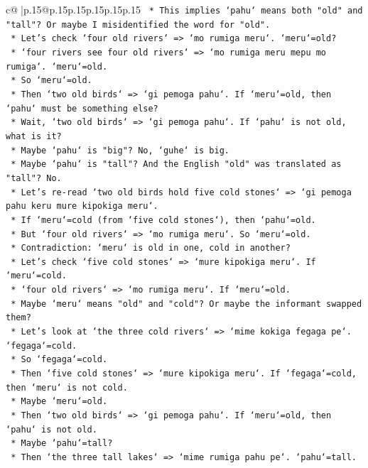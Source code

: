\documentclass{article}
\begin{document}
{\begin{supertabular}{c@{$\;$}|p{.15\linewidth}@{}p{.15\linewidth}p{.15\linewidth}p{.15\linewidth}p{.15\linewidth}p{.15\linewidth}}
{{{\texttt{    *   This implies `pahu` means both "old" and "tall"? Or maybe I misidentified the word for "old".} \\
\texttt{    *   Let's check `four old rivers` => `mo rumiga meru`. `meru`=old?} \\
\texttt{    *   `four rivers see four old rivers` => `mo rumiga meru mepu mo rumiga`. `meru`=old.} \\
\texttt{    *   So `meru`=old.} \\
\texttt{    *   Then `two old birds` => `gi pemoga pahu`. If `meru`=old, then `pahu` must be something else?} \\
\texttt{    *   Wait, `two old birds` => `gi pemoga pahu`. If `pahu` is not old, what is it?} \\
\texttt{    *   Maybe `pahu` is "big"? No, `guhe` is big.} \\
\texttt{    *   Maybe `pahu` is "tall"? And the English "old" was translated as "tall"? No.} \\
\texttt{    *   Let's re{-}read `two old birds hold five cold stones` => `gi pemoga pahu keru mure kipokiga meru`.} \\
\texttt{    *   If `meru`=cold (from `five cold stones`), then `pahu`=old.} \\
\texttt{    *   But `four old rivers` => `mo rumiga meru`. So `meru`=old.} \\
\texttt{    *   Contradiction: `meru` is old in one, cold in another?} \\
\texttt{    *   Let's check `five cold stones` => `mure kipokiga meru`. If `meru`=cold.} \\
\texttt{    *   `four old rivers` => `mo rumiga meru`. If `meru`=old.} \\
\texttt{    *   Maybe `meru` means "old" and "cold"? Or maybe the informant swapped them?} \\
\texttt{    *   Let's look at `the three cold rivers` => `mime kokiga fegaga pe`. `fegaga`=cold.} \\
\texttt{    *   So `fegaga`=cold.} \\
\texttt{    *   Then `five cold stones` => `mure kipokiga meru`. If `fegaga`=cold, then `meru` is not cold.} \\
\texttt{    *   Maybe `meru`=old.} \\
\texttt{    *   Then `two old birds` => `gi pemoga pahu`. If `meru`=old, then `pahu` is not old.} \\
\texttt{    *   Maybe `pahu`=tall?} \\
\texttt{    *   Then `the three tall lakes` => `mime rumiga pahu pe`. `pahu`=tall.} \\
}}}
\end{supertabular}}
\end{document}
